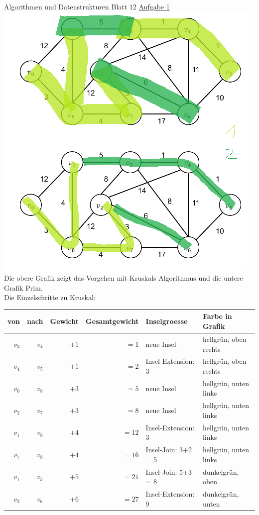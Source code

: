 \documentclass[12pt]{article} %
\newcommand{\aufgabe}[2]{{\LARGE Algorithmen und Datenstrukturen Blatt #1 \underline{Aufgabe #2}}\\[3.5ex]  }
\begin{document}
\aufgabe{12}{1} 
\includegraphics{Blatt12A1.png} \\
Die obere Grafik zeigt das Vorgehen mit Kruskals Algorithmus und die untere Grafik Prim. \\
Die Einzelschritte zu Kruskal: \\
\begin{tabular}{| r r | r | r | l | l |}
\hline
von & nach & Gewicht & Gesamtgewicht & Inselgroesse & Farbe in Grafik \\ \hline
$v_{3}$ & $v_{4}$ & $+1$ & $= 1$ & neue Insel & \textcolor{hellgruen}{hellgrün, oben rechts} \\ \hline
$v_{4}$ & $v_{5}$ & $+1$ & $= 2$ & Insel-Extension: 3 & \textcolor{hellgruen}{hellgrün, oben rechts} \\ \hline
$v_{0}$ & $v_{8}$ & $+3$ & $= 5$ & neue Insel & \textcolor{hellgruen}{hellgrün, unten links} \\ \hline
$v_{2}$ & $v_{7}$ & $+3$ & $= 8$ & neue Insel & \textcolor{hellgruen}{hellgrün, unten links} \\ \hline
$v_{1}$ & $v_{8}$ & $+4$ & $= 12$ & Insel-Extension: 3 & \textcolor{hellgruen}{hellgrün, unten links} \\ \hline
$v_{7}$ & $v_{8}$ & $+4$ & $= 16$ & Insel-Join: 3+2 = 5 & \textcolor{hellgruen}{hellgrün, unten links} \\ \hline
$v_{1}$ & $v_{3}$ & $+5$ & $= 21$ & Insel-Join: 5+3 = 8 & \textcolor{dunkelgruen}{dunkelgrün, oben} \\ \hline
$v_{2}$ & $v_{6}$ & $+6$ & $= 27$ & Insel-Extension: 9 & \textcolor{dunkelgruen}{dunkelgrün, unten} \\ \hline
\end{tabular} \\[1cm]
\end{document}
